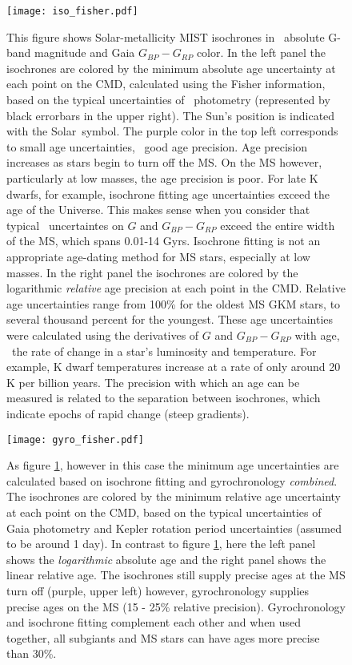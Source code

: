 \begin{figure}
  \caption{
    This figure shows Solar-metallicity MIST isochrones in \Gaia\ absolute
    G-band magnitude and Gaia $G_{BP} - G_{RP}$ color.
    In the left panel the isochrones are colored by the minimum absolute age
    uncertainty at each point on the CMD, calculated using the Fisher
    information, based on the typical uncertainties of \Gaia\ photometry
    (represented by black errorbars in the upper right).
    The Sun's position \citep{casagrande2018} is indicated with the Solar\
    symbol.
    The purple color in the top left corresponds to small age uncertainties,
    \ie\ good age precision.
    Age precision increases as stars begin to turn off the MS.
    On the MS however, particularly at low masses, the age precision is poor.
    For late K dwarfs, for example, isochrone fitting age uncertainties exceed
    the age of the Universe.
    This makes sense when you consider that typical \Gaia\ uncertaintes on $G$
    and $G_{BP} - G_{RP}$ exceed the entire width of the MS, which spans
    0.01-14 Gyrs.
    Isochrone fitting is not an appropriate age-dating method for MS stars,
    especially at low masses.
    In the right panel the isochrones are colored by the logarithmic
    {\it relative} age precision at each point in the CMD.
    Relative age uncertainties range from 100\% for the oldest MS GKM stars,
    to several thousand percent for the youngest.
    These age uncertainties were calculated using the derivatives of $G$ and
    $G_{BP} - G_{RP}$ with age, \ie\ the rate of change in a star's luminosity
    and temperature.
    For example, K dwarf temperatures increase at a rate of only around 20 K
    per billion years.
    The precision with which an age can be measured is related to the
    separation between isochrones, which indicate epochs of rapid change
    (steep gradients).
    \label{fig:fischer_iso}
}
  \centering
    \texttt{[image: iso\_fisher.pdf]}
\label{fig:iso_fisher}
\end{figure}

\begin{figure}
  \caption{
    As figure \ref{fig:iso_fisher}, however in this case the minimum age
    uncertainties are calculated based on isochrone fitting and gyrochronology
    {\it combined}.
    The isochrones are colored by the minimum relative age uncertainty at each
    point on the CMD, based on the typical uncertainties of Gaia photometry
    and Kepler rotation period uncertainties (assumed to be around 1 day).
    In contrast to figure \ref{fig:iso_fisher}, here the left panel shows the
    {\it logarithmic} absolute age and the right panel shows the linear
    relative age.
    The isochrones still supply precise ages at the MS turn off (purple, upper
    left) however, gyrochronology supplies precise ages on the MS (15 - 25\%
    relative precision).
    Gyrochronology and isochrone fitting complement each other and when used
    together, all subgiants and MS stars can have ages more precise than 30\%.
    \label{fig:fischer_gyro}
}
  \centering
    \texttt{[image: gyro\_fisher.pdf]}
\label{fig:gyro_fisher}
\end{figure}
